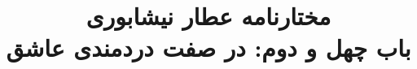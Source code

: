 \documentclass[14pt,b5paper]{article}
\begin{document}
\title{\Huge مختارنامه عطار نیشابوری \\
باب چهل و دوم: در صفت دردمندی عاشق}
\author{ }
\date{ }
\maketitle
\newpage
\tableofcontents
\newpage

\newpage

\newpage

\newpage

\newpage

\newpage

\newpage

\newpage

\newpage

\newpage

\newpage

\newpage

\newpage

\newpage

\newpage

\newpage

\newpage

\newpage

\newpage

\newpage

\newpage

\newpage

\newpage

\newpage

\newpage
\end{document}
